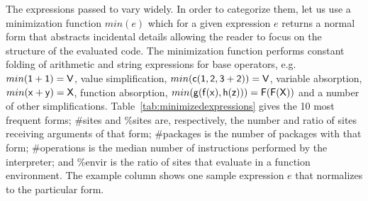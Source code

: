 \documentclass[screen,acmsmall]{acmart}%
\begin{document}
The expressions passed to \eval vary widely. In order to categorize them, let us
use a minimization function $min(e)$ which for a given expression $e$ returns a
normal form that abstracts incidental details allowing the reader to focus on
the structure of the evaluated code. The minimization function performs constant
folding of arithmetic and string expressions for base operators, e.g.
$min({\sf 1+1})={\sf V}$, value simplification, $min({\sf c(1,2,3+2)})={\sf V}$,
variable absorption, $min({\sf x+y})={\sf X}$, function absorption,
$min({\sf g(f(x),h(z))})={\sf F(F(X))}$ and a number of other simplifications.
Table~\ref{tab:minimizedexpressions} gives the 10 most frequent forms; \#sites
and \%sites are, respectively, the number and ratio of sites receiving arguments
of that form; \#packages is the number of packages with that form; \#operations
is the median number of instructions performed by the interpreter; and \%envir
is the ratio of sites that evaluate in a function environment. The example
column shows one sample expression $e$ that normalizes to the particular form.
\end{document}
